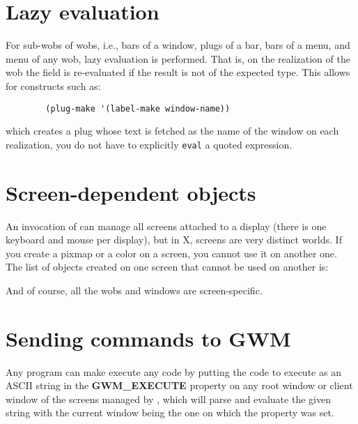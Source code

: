 \section{Lazy evaluation}

For sub-wobs of wobs, i.e., bars of a window, plugs of a bar, bars of a
menu, and menu of any wob, lazy evaluation is performed. That is, on the
realization of the wob the field is re-evaluated if the result is not
of the expected type. This allows for constructs such as:

{\exemplefont\begin{verbatim}
        (plug-make '(label-make window-name))
\end{verbatim}}

which creates a plug whose text is fetched as the name of the
window on each realization, you do not have to explicitly \verb"eval" a
quoted expression.

\section{Screen-dependent objects}

An invocation of {\GWM} can manage all screens attached to a display (there
is one keyboard and mouse per display), but in X, screens are very distinct
worlds. If you create a pixmap or a color on a screen, you cannot use it on
another one. The list of objects created on one screen that cannot be used
on another is:


And of course, all the wobs and windows are screen-specific.

\section{Sending commands to GWM}

Any program can make {\GWM} execute any {\WOOL} code by putting the {\WOOL}
code to execute as an ASCII string in the {\bf GWM\_EXECUTE}
\label{GWM_EXECUTE} property on any root window or client window
of the screens managed by {\GWM}, which will parse and evaluate the given
string with the current window being the one on which the property was set.

